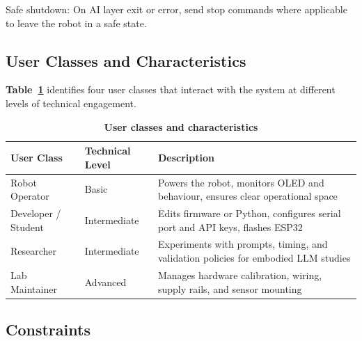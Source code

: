 Safe shutdown: On AI layer exit or error, send stop commands where applicable to leave the robot in a safe state.

\subsection{User Classes and Characteristics}
\label{subsec:users}

\textbf{Table~\ref{tab:users}} identifies four user classes that interact with the system at different levels of technical engagement.

\begin{table}[htbp!]
\centering
\caption[User classes and characteristics]{\textbf{User classes and characteristics}}
\label{tab:users}
\begin{tabularx}{\textwidth}{|l|l|X|}
\hline
\textbf{User Class} & \textbf{Technical Level} & \textbf{Description} \\
\hline
Robot Operator      & Basic          & Powers the robot, monitors OLED and behaviour, ensures clear operational space \\
\hline
Developer / Student & Intermediate   & Edits firmware or Python, configures serial port and API keys, flashes ESP32 \\
\hline
Researcher          & Intermediate   & Experiments with prompts, timing, and validation policies for embodied LLM studies \\
\hline
Lab Maintainer      & Advanced       & Manages hardware calibration, wiring, supply rails, and sensor mounting \\
\hline
\end{tabularx}
\end{table}

\subsection{Constraints}
\label{subsec:constraints}

